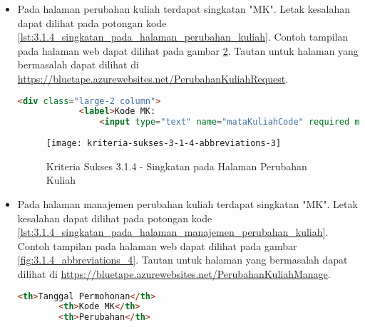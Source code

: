 \begin{itemize}
    \begin{figure}[H]
        \centering  
        \texttt{[image: kriteria-sukses-3-1-4-abbreviations-2]}  
        \caption[Kriteria Sukses 3.1.4 - Singkatan pada Halaman Manajemen Cetak Transkrip]{Kriteria Sukses 3.1.4 - Singkatan pada Halaman Manajemen Cetak Transkrip}
        \label{fig:3.1.4_abbreviations_2}  
    \end{figure}
    
    \item Pada halaman perubahan kuliah terdapat singkatan "MK". Letak kesalahan dapat dilihat pada potongan kode \ref{lst:3.1.4_singkatan_pada_halaman_perubahan_kuliah}. Contoh tampilan pada halaman web dapat dilihat pada gambar \ref{fig:3.1.4_abbreviations_3}. Tautan untuk halaman yang bermasalah dapat dilihat di \url{https://bluetape.azurewebsites.net/PerubahanKuliahRequest}.
    \begin{lstlisting}[frame=single, label={lst:3.1.4_singkatan_pada_halaman_perubahan_kuliah}, language=HTML, caption=Kriteria Sukses 3.1.4 - Singkatan pada Halaman Perubahan Kuliah]
        <div class="large-2 column">
            <label>Kode MK:
                <input type="text" name="mataKuliahCode" required maxlength="9" pattern="[A-Z]{3}[0-9]{3}([0-9]{3})?" title="Kode MK dalam format XYZ123"/>
    \end{lstlisting}

    \begin{figure}[H]
        \centering  
        \texttt{[image: kriteria-sukses-3-1-4-abbreviations-3]}  
        \caption[Kriteria Sukses 3.1.4 - Singkatan pada Halaman Perubahan Kuliah]{Kriteria Sukses 3.1.4 - Singkatan pada Halaman Perubahan Kuliah}
        \label{fig:3.1.4_abbreviations_3}  
    \end{figure}
    
    \item Pada halaman manajemen perubahan kuliah terdapat singkatan "MK". Letak kesalahan dapat dilihat pada potongan kode \ref{lst:3.1.4_singkatan_pada_halaman_manajemen_perubahan_kuliah}. Contoh tampilan pada halaman web dapat dilihat pada gambar \ref{fig:3.1.4_abbreviations_4}. Tautan untuk halaman yang bermasalah dapat dilihat di \url{https://bluetape.azurewebsites.net/PerubahanKuliahManage}.
    \begin{lstlisting}[frame=single, label={lst:3.1.4_singkatan_pada_halaman_manajemen_perubahan_kuliah}, language=HTML, caption=Kriteria Sukses 3.1.4 - Singkatan pada Halaman Manajemen Perubahan Kuliah]
        <th>Tanggal Permohonan</th>
        <th>Kode MK</th>
        <th>Perubahan</th>
    \end{lstlisting}


\end{itemize}
